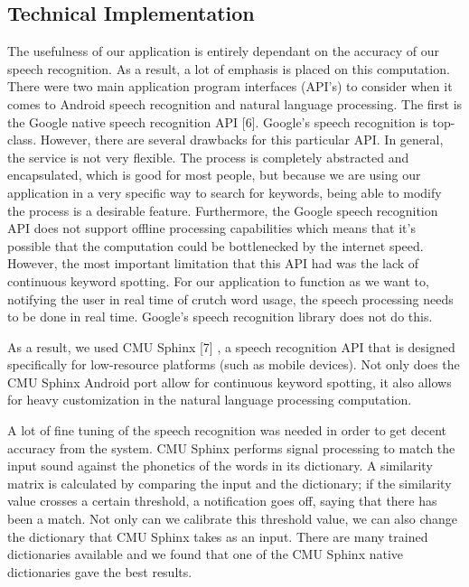 \documentclass{sigchi}
\begin{document}
\subsection{Technical Implementation}

The usefulness of our application is entirely dependant on the accuracy of our speech recognition. As a result, a lot of emphasis is placed on this computation. There were two main application program interfaces (API’s) to consider when it comes to Android speech recognition and natural language processing. The first is the Google native speech recognition API [6]. Google's speech recognition is top-class. However, there are several drawbacks for this particular API. In general, the service is not very flexible. The process is completely abstracted and encapsulated, which is good for most people, but because we are using our application in a very specific way to search for keywords, being able to modify the process is a desirable feature. Furthermore, the Google speech recognition API does not support offline processing capabilities which means that it’s possible that the computation could be bottlenecked by the internet speed. However, the most important limitation that this API had was the lack of continuous keyword spotting. For our application to function as we want to, notifying the user in real time of crutch word usage, the speech processing needs to be done in real time. Google’s speech recognition library does not do this. 

As a result, we used CMU Sphinx [7]	, a speech recognition API that is designed specifically for low-resource platforms (such as mobile devices). Not only does the CMU Sphinx Android port allow for continuous keyword spotting, it also allows for heavy customization in the natural language processing computation. 

A lot of fine tuning of the speech recognition was needed in order to get decent accuracy from the system. CMU Sphinx performs signal processing to match the input sound against the phonetics of the words in its dictionary. A similarity matrix is calculated by comparing the input and the dictionary; if the similarity value crosses a certain threshold, a notification goes off, saying that there has been a match. Not only can we calibrate this threshold value, we can also change the dictionary that CMU Sphinx takes as an input. There are many trained dictionaries available and we found that one of the CMU Sphinx native dictionaries gave the best results.
\end{document}
